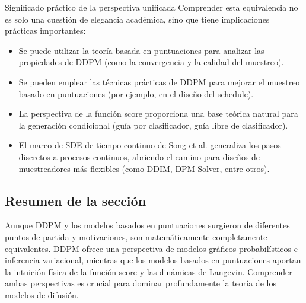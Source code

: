 \begin{importantbox}{Significado práctico de la perspectiva unificada}
Comprender esta equivalencia no es solo una cuestión de elegancia académica, sino que tiene implicaciones prácticas importantes:
\begin{itemize}
    \item Se puede utilizar la teoría basada en puntuaciones para analizar las propiedades de DDPM (como la convergencia y la calidad del muestreo).
    \item Se pueden emplear las técnicas prácticas de DDPM para mejorar el muestreo basado en puntuaciones (por ejemplo, en el diseño del schedule).
    \item La perspectiva de la función score proporciona una base teórica natural para la generación condicional (guía por clasificador, guía libre de clasificador).
    \item El marco de SDE de tiempo continuo de Song et al. generaliza los pasos discretos a procesos continuos, abriendo el camino para diseños de muestreadores más flexibles (como DDIM, DPM-Solver, entre otros).
\end{itemize}
\end{importantbox}

\subsection{Resumen de la sección}

Aunque DDPM y los modelos basados en puntuaciones surgieron de diferentes puntos de partida y motivaciones, son matemáticamente completamente equivalentes. DDPM ofrece una perspectiva de modelos gráficos probabilísticos e inferencia variacional, mientras que los modelos basados en puntuaciones aportan la intuición física de la función score y las dinámicas de Langevin. Comprender ambas perspectivas es crucial para dominar profundamente la teoría de los modelos de difusión.


